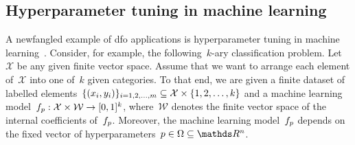 \subsection{Hyperparameter tuning in machine learning}
\label{subsec:machine-learning}

A newfangled example of \gls{dfo} applications is hyperparameter tuning in machine learning~\cite{Ghanbari_Scheinberg_2017}.
Consider, for example, the following~$k$-ary classification problem.
Let~$\mathcal{X}$ be any given finite vector space.
Assume that we want to arrange each element of~$\mathcal{X}$ into one of~$k$ given categories.
To that end, we are given a finite dataset of labelled elements~$\{(x_i, y_i)\}_{i = 1, 2, \dots, m} \subseteq \mathcal{X} \times \{1, 2, \dots, k\}$ and a machine learning model~$f_p : \mathcal{X} \times \mathcal{W} \to [0, 1]^k$, where~$\mathcal{W}$ denotes the finite vector space of the internal coefficients of~$f_p$.
Moreover, the machine learning model~$f_p$ depends on the fixed vector of hyperparameters~$p \in \Omega \subseteq \R^n$.


